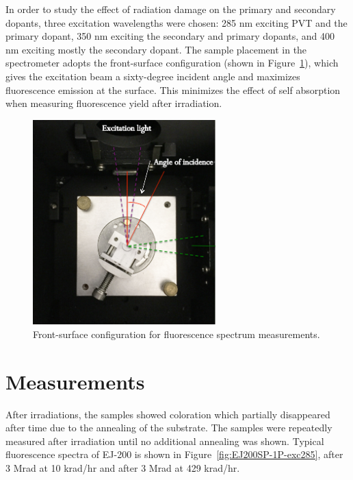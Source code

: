 \documentclass[preprint,12pt]{elsarticle}
\begin{document}
In order to study the effect of radiation damage on the primary and secondary dopants, three excitation wavelengths were chosen: 
285 nm 	exciting PVT and the primary dopant, 
350 nm exciting the secondary and primary dopants, 
and 400 nm exciting mostly the secondary dopant. 
The sample placement in the spectrometer adopts the front-surface configuration (shown in Figure~\ref{fig:sample_placement}), 
which gives the excitation beam a sixty-degree incident angle and maximizes fluorescence emission at the surface. 
This minimizes the effect of self absorption when measuring fluorescence yield after irradiation. 

\begin{figure}[!h]
	\centering
	\includegraphics[width=200pt]{./figures/sample_placement.png}
	\caption{Front-surface configuration for fluorescence spectrum measurements.}
	\label{fig:sample_placement}
\end{figure}

\section{Measurements} 
After irradiations, the samples showed coloration which partially disappeared after time due to the annealing of the substrate. 
The samples were repeatedly measured after irradiation until no additional annealing was shown. 
Typical fluorescence spectra of EJ-200 is shown in Figure~\ref{fig:EJ200SP-1P-exc285}, 
after 3 Mrad at 10 krad/hr and after 3 Mrad at 429 krad/hr.
\end{document}
